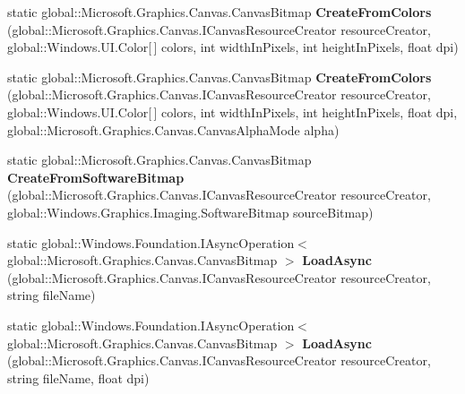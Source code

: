 \begin{DoxyCompactItemize}
\mbox{\label{class_microsoft_1_1_graphics_1_1_canvas_1_1_canvas_bitmap_a488d3b7c9e0730ddce84772fc314dedc}} 
static global\+::\+Microsoft.\+Graphics.\+Canvas.\+Canvas\+Bitmap {\bfseries Create\+From\+Colors} (global\+::\+Microsoft.\+Graphics.\+Canvas.\+I\+Canvas\+Resource\+Creator resource\+Creator, global\+::\+Windows.\+U\+I.\+Color\mbox{[}$\,$\mbox{]} colors, int width\+In\+Pixels, int height\+In\+Pixels, float dpi)
\item 
\mbox{\label{class_microsoft_1_1_graphics_1_1_canvas_1_1_canvas_bitmap_a00bad59ca00bf7edd9ce60d8a4aded82}} 
static global\+::\+Microsoft.\+Graphics.\+Canvas.\+Canvas\+Bitmap {\bfseries Create\+From\+Colors} (global\+::\+Microsoft.\+Graphics.\+Canvas.\+I\+Canvas\+Resource\+Creator resource\+Creator, global\+::\+Windows.\+U\+I.\+Color\mbox{[}$\,$\mbox{]} colors, int width\+In\+Pixels, int height\+In\+Pixels, float dpi, global\+::\+Microsoft.\+Graphics.\+Canvas.\+Canvas\+Alpha\+Mode alpha)
\item 
\mbox{\label{class_microsoft_1_1_graphics_1_1_canvas_1_1_canvas_bitmap_afcc3780c1206b46f43b6c56426ce3240}} 
static global\+::\+Microsoft.\+Graphics.\+Canvas.\+Canvas\+Bitmap {\bfseries Create\+From\+Software\+Bitmap} (global\+::\+Microsoft.\+Graphics.\+Canvas.\+I\+Canvas\+Resource\+Creator resource\+Creator, global\+::\+Windows.\+Graphics.\+Imaging.\+Software\+Bitmap source\+Bitmap)
\item 
\mbox{\label{class_microsoft_1_1_graphics_1_1_canvas_1_1_canvas_bitmap_ac19e32a381114faa58a2ff1012d712e0}} 
static global\+::\+Windows.\+Foundation.\+I\+Async\+Operation$<$ global\+::\+Microsoft.\+Graphics.\+Canvas.\+Canvas\+Bitmap $>$ {\bfseries Load\+Async} (global\+::\+Microsoft.\+Graphics.\+Canvas.\+I\+Canvas\+Resource\+Creator resource\+Creator, string file\+Name)
\item 
\mbox{\label{class_microsoft_1_1_graphics_1_1_canvas_1_1_canvas_bitmap_ab43fae45180aa4d2fad4cd9b9426416e}} 
static global\+::\+Windows.\+Foundation.\+I\+Async\+Operation$<$ global\+::\+Microsoft.\+Graphics.\+Canvas.\+Canvas\+Bitmap $>$ {\bfseries Load\+Async} (global\+::\+Microsoft.\+Graphics.\+Canvas.\+I\+Canvas\+Resource\+Creator resource\+Creator, string file\+Name, float dpi)

\end{DoxyCompactItemize}
